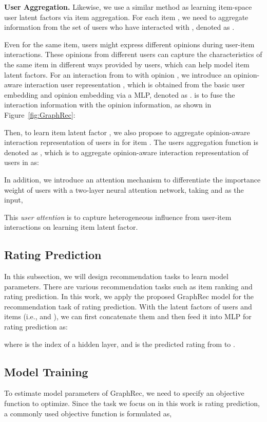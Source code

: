 \documentclass[sigconf]{acmart} \copyrightyear{2019}
\begin{document}
{\bf User Aggregation.} Likewise, we use a similar method as learning item-space user latent factors via item aggregation. For each item , we need to aggregate information from the set of users who have interacted with , denoted as . 

Even for the same item, users might express different opinions during user-item interactions. These opinions from different users can capture the characteristics of the same item in different ways provided by users, which can help model item latent factors. For an interaction from  to  with opinion , we introduce an opinion-aware interaction user representation , which is obtained from the basic user embedding  and opinion embedding  via a MLP, denoted as .  is to fuse the interaction information with the opinion information, as shown in Figure~\ref{fig:GraphRec}:


Then, to learn item latent factor , we also propose to aggregate opinion-aware interaction representation of users in  for item . The users aggregation function is denoted as , which is to aggregate opinion-aware interaction representation of users in  as:


In addition, we introduce an attention mechanism to differentiate the importance weight   of users with a two-layer neural attention network, taking  and  as the input,

This \emph{user attention}  is to capture heterogeneous influence from user-item interactions on learning item latent factor. 

\subsection{Rating Prediction}

In this subsection, we will design recommendation tasks to learn model parameters. There are various recommendation tasks such as item ranking and rating prediction. In this work, we apply the proposed GraphRec model for the recommendation task of rating prediction. With the latent factors of users and items (i.e.,  and ), we can first concatenate them  and then feed it into MLP for rating prediction as:

where  is the index of a hidden layer, and  is the predicted rating from  to .

\subsection{Model Training}

To estimate model parameters of GraphRec, we need to specify an objective function to optimize. Since the task we focus on in this work is rating prediction, a commonly used objective function is formulated as,
\end{document}
